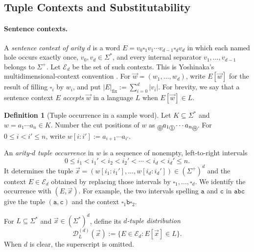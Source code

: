 \documentclass[11pt]{article}
\numberwithin{equation}{section}
\theoremstyle{plain}
\theoremstyle{definition}
\newtheorem{definition}[theorem]{Definition}
\theoremstyle{remark}
\newcommand{\D}{\mathcal{D}}
\newcommand{\tuple}[1]{\vec{#1}}
\newcommand{\blank}{\square}
\newcommand{\cutpos}[1]{%
  \raisebox{-0.7ex}{%
    \tikz[baseline=(char.base)]{%
      \node[draw,circle,inner sep=0.4pt,font=\scriptsize]
        (char) {\ensuremath{#1}};%
    }%
  }%
}
\begin{document}
\subsection{Tuple Contexts and Substitutability}

\paragraph{Sentence contexts.}
A \emph{sentence context of arity $d$} is a word
$E=v_0\blank_1v_1\cdots v_{d-1}\blank_dv_d$ in which each named hole occurs
exactly once, $v_0,v_d\in\Sigma^*$, and every internal separator
$v_1,\ldots,v_{d-1}$ belongs to $\Sigma^+$.  Let $\mathcal E_d$ be the set
of such contexts.  This is Yoshinaka's multidimensional-context convention
\cite[Section~3.1]{Yoshinaka2011}.
For $\tuple w=(w_1,\ldots,w_d)$, write $E[\tuple w]$ for the result of filling
$\blank_i$ by $w_i$, and put
$|E|_{\mathrm{fix}}:=\sum_{i=0}^d|v_i|$.  For brevity, we say that a
sentence context $E$ \emph{accepts} $\tuple w$ in a language $L$ when
$E[\tuple w]\in L$.

\begin{definition}[Tuple occurrence in a sample word]
\label{def:tuple-occurrence}
Let $K\subseteq\Sigma^*$ and $w=a_1\cdots a_n\in K$.  Number the cut
positions of $w$ as
$\cutpos{0}a_1\cutpos{1}\cdots a_n\cutpos{n}$.
For $0\le i<i'\le n$, write
$w[i:i']:=a_{i+1}\cdots a_{i'}$.

An \emph{arity-$d$ tuple occurrence} in $w$ is a sequence of nonempty,
left-to-right intervals
\[
  0\le i_1<i_1'<i_2<i_2'<\cdots<i_d<i_d'\le n.
\]
It determines the tuple
$\tuple x=(w[i_1:i_1'],\ldots,w[i_d:i_d'])\in(\Sigma^+)^d$ and the
context $E\in\mathcal E_d$ obtained by replacing those intervals by
$\blank_1,\ldots,\blank_d$.  We identify the occurrence with $(E,\tuple x)$.
For example, the two intervals spelling $\mathtt a$ and $\mathtt c$ in $\mathtt{abc}$ give the tuple
$(\mathtt a,\mathtt c)$ and the context $\blank_1\mathtt b\blank_2$.
\end{definition}

For $L\subseteq\Sigma^*$ and $\tuple x\in(\Sigma^*)^d$, define its
\emph{$d$-tuple distribution}
\[
  \D_L^{(d)}(\tuple x):=\{E\in\mathcal E_d:E[\tuple x]\in L\}.
\]
When $d$ is clear, the superscript is omitted.
\end{document}
